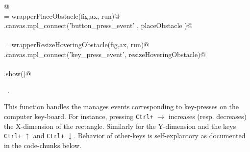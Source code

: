\documentclass[11.5pt]{report}
\begin{document}
\begin{flushleft}
\begin{list}{}{}
\mbox{}\verb@    @\\
\mbox{}\verb@placeObstacle  = wrapperPlaceObstacle(fig,ax, run)@\\
\mbox{}\verb@fig.canvas.mpl_connect('button_press_event' , placeObstacle )@\\
\mbox{}\verb@@\\
\mbox{}\verb@resizeHoveringObstacle  = wrapperResizeHoveringObstacle(fig,ax, run)@\\
\mbox{}\verb@fig.canvas.mpl_connect('key_press_event', resizeHoveringObstacle)@\\
\mbox{}\verb@@\\
\mbox{}\verb@plt.show()@\\
\mbox{}\verb@@{\NWsep}
\end{list}
\vspace{-1.5ex}
\footnotesize
\begin{list}{}{\setlength{\itemsep}{-\parsep}\setlength{\itemindent}{-\leftmargin}}
\item \NWtxtMacroRefIn\ .

\item{}
\end{list}
\vspace{4ex}
\end{flushleft}

This function handles the manages events corresponding to key-presses on the computer key-board. For instance, 
pressing \verb|Ctrl+| $\rightarrow$ increases (resp. decreases) the X-dimension of the rectangle. Similarly for 
the Y-dimension and the keys \verb|Ctrl+| $\uparrow$ and \verb|Ctrl+| $\downarrow$. Behavior of other-keys is 
self-explantory as documented in the code-chunks below.  
\end{document}
